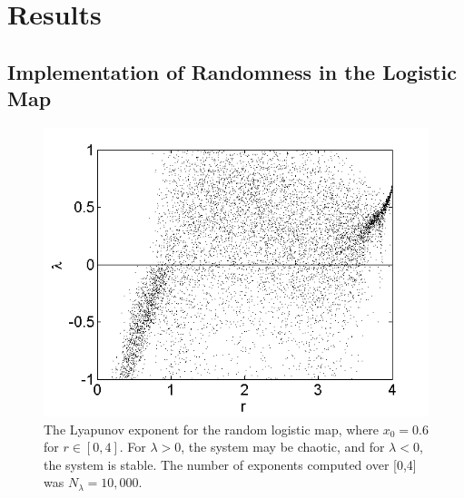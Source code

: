\chapter{Results}
\section{Implementation of Randomness in the Logistic Map}
\begin{figure}[!h]
\caption[Lyapunov exponent in the random logistic map]{The
  Lyapunov exponent for the random logistic map, where $x_0=0.6$ for $r \in
  [0,4]$. For $\lambda>0$, the system may be chaotic, and for $\lambda
  <0$, the system is stable. The number of exponents computed over
  [0,4] was $N_\lambda=10,000$.}\label{fig:detloglyap1}
	\begin{center}
		\includegraphics[scale=0.65]{figs/r_log_lyap_all.png}
	\end{center}
\end{figure} 

